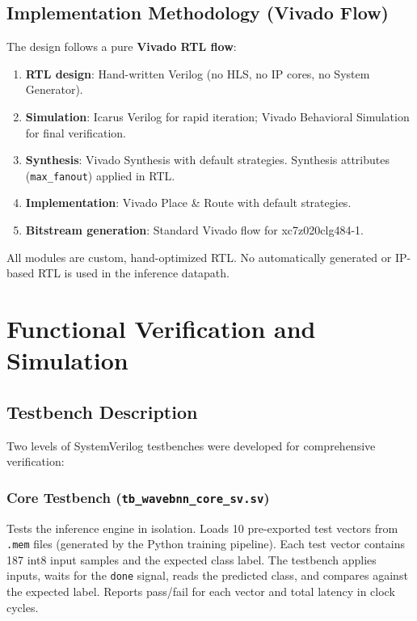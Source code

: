 \documentclass[conference]{IEEEtran}
\begin{document}
\subsection{Implementation Methodology (Vivado Flow)}

The design follows a pure \textbf{Vivado RTL flow}:
\begin{enumerate}
    \item \textbf{RTL design}: Hand-written Verilog (no HLS, no IP cores, no System Generator).
    \item \textbf{Simulation}: Icarus Verilog for rapid iteration; Vivado Behavioral Simulation for final verification.
    \item \textbf{Synthesis}: Vivado Synthesis with default strategies. Synthesis attributes (\texttt{max\_fanout}) applied in RTL.
    \item \textbf{Implementation}: Vivado Place \& Route with default strategies.
    \item \textbf{Bitstream generation}: Standard Vivado flow for xc7z020clg484-1.
\end{enumerate}

All modules are custom, hand-optimized RTL. No automatically generated or IP-based RTL is used in the inference datapath.

\section{Functional Verification and Simulation}

\subsection{Testbench Description}

Two levels of SystemVerilog testbenches were developed for comprehensive verification:

\subsubsection{Core Testbench (\texttt{tb\_wavebnn\_core\_sv.sv})}
Tests the inference engine in isolation. Loads 10 pre-exported test vectors from \texttt{.mem} files (generated by the Python training pipeline). Each test vector contains 187 int8 input samples and the expected class label. The testbench applies inputs, waits for the \texttt{done} signal, reads the predicted class, and compares against the expected label. Reports pass/fail for each vector and total latency in clock cycles.
\end{document}

